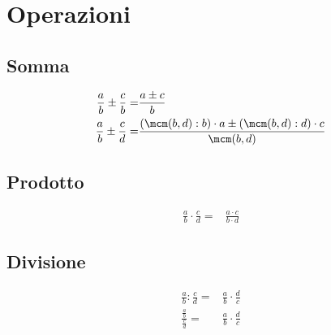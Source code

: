 \section{Operazioni}
\subsection{Somma}
\begin{align}
\frac{a}{b}\pm\frac{c}{b}=&\frac{a\pm c}{b}\\
\frac{a}{b}\pm\frac{c}{d}=&\frac{(\mcm(b,d):b)\cdot a\pm(\mcm(b,d):d)\cdot c}{\mcm(b,d)}
\end{align}
\subsection{Prodotto}
\begin{align}
\frac{a}{b}\cdot\frac{c}{d}=&\frac{a\cdot c}{b\cdot d}
\end{align}
\subsection{Divisione}
\begin{align}
\frac{a}{b}:\frac{c}{d}=&\frac{a}{b}\cdot\frac{d}{c}\\
\frac{\frac{a}{b}}{\frac{c}{d}}=&\frac{a}{b}\cdot\frac{d}{c}
\end{align}
